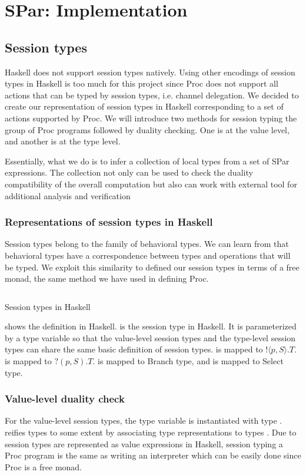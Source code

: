 \chapter{SPar: Implementation} \label{chap:impl}
\section{Session types} \label{impl:sec:session}
Haskell does not support session types natively. Using other encodings of session types in Haskell is too much for this project since Proc does not support all actions that can be typed by session types, i.e. channel delegation. We decided to create our representation of session types in Haskell corresponding to a set of actions supported by Proc. We will introduce two methods for session typing the group of Proc programs followed by duality checking. One is at the value level, and another is at the type level.

Essentially, what we do is to infer a collection of local types from a set of SPar expressions. The collection not only can be used to check the duality compatibility of the overall computation but also can work with external tool \cite{langeVerifyingAsynchronousInteractions2019} for additional analysis and verification
\subsection{Representations of session types in Haskell}
Session types belong to the family of behavioral types. We can learn from  that behavioral types have a correspondence between types and operations that will be typed. We exploit this similarity to defined our session types in terms of a free monad, the same method we have used in defining Proc.

\begin{listing}[ht]
    \inputminted{Haskell}{impl/type.hs}
    \caption{Session types in Haskell}
    \label{impl:code:type}
\end{listing}

 shows the definition in Haskell.  is the session type in Haskell. It is parameterized by a type variable  so that the value-level session types and the type-level session types can share the same basic definition of session types.  is mapped to $! \langle p, S \rangle. T$.  is mapped to $?(p, S).T$.  is mapped to Branch type, and  is mapped to Select type.
\subsection{Value-level duality check}
For the value-level session types, the type variable  is instantiated with type .  reifies types to some extent by associating type representations to types \cite{DataTypeablea}. Due to session types are represented as value expressions in Haskell, session typing a Proc program is the same as writing an interpreter which can be easily done since Proc is a free monad. 

